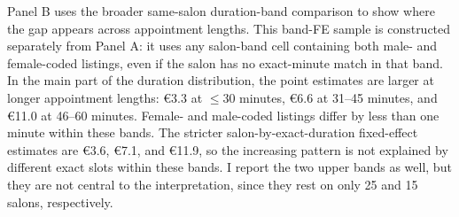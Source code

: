 \documentclass[12pt,a4paper]{article}
\begin{document}
Panel B uses the broader same-salon duration-band comparison to show where the gap appears across appointment lengths. This band-FE sample is constructed separately from Panel A: it uses any salon-band cell containing both male- and female-coded listings, even if the salon has no exact-minute match in that band. In the main part of the duration distribution, the point estimates are larger at longer appointment lengths: €3.3 at $\leq$30 minutes, €6.6 at 31--45 minutes, and €11.0 at 46--60 minutes. Female- and male-coded listings differ by less than one minute within these bands. The stricter salon-by-exact-duration fixed-effect estimates are €3.6, €7.1, and €11.9, so the increasing pattern is not explained by different exact slots within these bands. I report the two upper bands as well, but they are not central to the interpretation, since they rest on only 25 and 15 salons, respectively.
\end{document}
